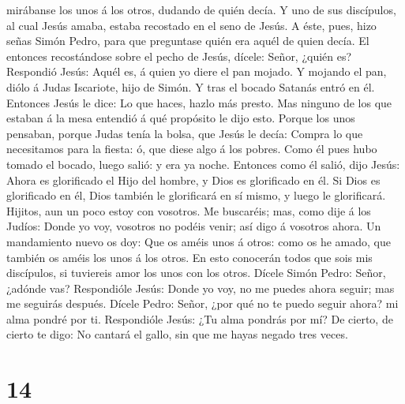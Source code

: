 mirábanse los unos á los otros, dudando de quién decía. 
Y uno de sus discípulos, al cual Jesús amaba, estaba recostado en el
seno de Jesús.  A éste, pues, hizo señas Simón Pedro,
para que preguntase quién era aquél de quien decía.  El
entonces recostándose sobre el pecho de Jesús, dícele: Señor, ¿quién es?
 Respondió Jesús: Aquél es, á quien yo diere el pan
mojado. Y mojando el pan, diólo á Judas Iscariote, hijo de Simón.
 Y tras el bocado Satanás entró en él. Entonces Jesús le
dice: Lo que haces, hazlo más presto.  Mas ninguno de los
que estaban á la mesa entendió á qué propósito le dijo esto.
 Porque los unos pensaban, porque Judas tenía la bolsa,
que Jesús le decía: Compra lo que necesitamos para la fiesta: ó, que
diese algo á los pobres.  Como él pues hubo tomado el
bocado, luego salió: y era ya noche.  Entonces como él
salió, dijo Jesús: Ahora es glorificado el Hijo del hombre, y Dios es
glorificado en él.  Si Dios es glorificado en él, Dios
también le glorificará en sí mismo, y luego le glorificará.
 Hijitos, aun un poco estoy con vosotros. Me buscaréis;
mas, como dije á los Judíos: Donde yo voy, vosotros no podéis venir; así
digo á vosotros ahora.  Un mandamiento nuevo os doy: Que
os améis unos á otros: como os he amado, que también os améis los unos á
los otros.  En esto conocerán todos que sois mis
discípulos, si tuviereis amor los unos con los otros. 
Dícele Simón Pedro: Señor, ¿adónde vas? Respondióle Jesús: Donde yo voy,
no me puedes ahora seguir; mas me seguirás después. 
Dícele Pedro: Señor, ¿por qué no te puedo seguir ahora? mi alma pondré
por ti.  Respondióle Jesús: ¿Tu alma pondrás por mí? De
cierto, de cierto te digo: No cantará el gallo, sin que me hayas negado
tres veces.

\hypertarget{section-13}{%
\section{14}\label{section-13}}

